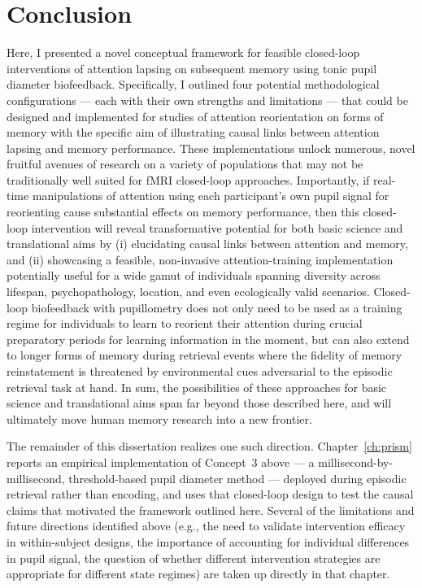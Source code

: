 \section{Conclusion}

Here, I presented a novel conceptual framework for feasible closed-loop interventions of attention lapsing on subsequent memory using tonic pupil diameter biofeedback. Specifically, I outlined four potential methodological configurations --- each with their own strengths and limitations --- that could be designed and implemented for studies of attention reorientation on forms of memory with the specific aim of illustrating causal links between attention lapsing and memory performance. These implementations unlock numerous, novel fruitful avenues of research on a variety of populations that may not be traditionally well suited for fMRI closed-loop approaches. Importantly, if real-time manipulations of attention using each participant's own pupil signal for reorienting cause substantial effects on memory performance, then this closed-loop intervention will reveal transformative potential for both basic science and translational aims by (i) elucidating causal links between attention and memory, and (ii) showcasing a feasible, non-invasive attention-training implementation potentially useful for a wide gamut of individuals spanning diversity across lifespan, psychopathology, location, and even ecologically valid scenarios. Closed-loop biofeedback with pupillometry does not only need to be used as a training regime for individuals to learn to reorient their attention during crucial preparatory periods for learning information in the moment, but can also extend to longer forms of memory during retrieval events where the fidelity of memory reinstatement is threatened by environmental cues adversarial to the episodic retrieval task at hand. In sum, the possibilities of these approaches for basic science and translational aims span far beyond those described here, and will ultimately move human memory research into a new frontier.

\bigskip

\noindent The remainder of this dissertation realizes one such direction. Chapter~\ref{ch:prism} reports an empirical implementation of Concept~3 above --- a millisecond-by-millisecond, threshold-based pupil diameter method --- deployed during episodic retrieval rather than encoding, and uses that closed-loop design to test the causal claims that motivated the framework outlined here. Several of the limitations and future directions identified above (e.g., the need to validate intervention efficacy in within-subject designs, the importance of accounting for individual differences in pupil signal, the question of whether different intervention strategies are appropriate for different state regimes) are taken up directly in that chapter.
